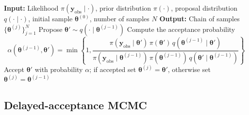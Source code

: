 \documentclass{elsarticle}
\begin{document}
\begin{algorithm}[t]
\caption{Metropolis--Hastings (MH)}
\label{alg:mh}
\begin{algorithmic}[1]
\Statex \textbf{Input:} Likelihood $\pi(\mathbf y_{\mathrm{obs}}\mid \cdot)$, prior distribution $\pi(\cdot)$, proposal distribution $q(\cdot\mid\cdot)$, initial sample $\boldsymbol{\theta}^{(0)}$, number of samples $N$
\Statex \textbf{Output:} Chain of samples $\{\boldsymbol{\theta}^{(j)}\}_{j=1}^N$
    \State Propose $\boldsymbol{\theta}' \sim q(\cdot\mid \boldsymbol{\theta}^{(j-1)})$
    \State Compute the acceptance probability
    \begin{equation*}
        \alpha\!\left(\boldsymbol{\theta}^{(j-1)},\boldsymbol{\theta}'\right)
        =
        \min\left\{
        1,
        \frac{
        \pi(\mathbf y_{\mathrm{obs}}\mid \boldsymbol{\theta}')\,
        \pi(\boldsymbol{\theta}')\,
        q(\boldsymbol{\theta}^{(j-1)}\mid \boldsymbol{\theta}')
        }{
        \pi(\mathbf y_{\mathrm{obs}}\mid \boldsymbol{\theta}^{(j-1)})\,
        \pi(\boldsymbol{\theta}^{(j-1)})\,
        q(\boldsymbol{\theta}'\mid \boldsymbol{\theta}^{(j-1)})
        }
        \right\}
    \end{equation*}
    \State Accept $\boldsymbol{\theta}'$ with probability $\alpha$; if accepted set $\boldsymbol{\theta}^{(j)}=\boldsymbol{\theta}'$, otherwise set $\boldsymbol{\theta}^{(j)}=\boldsymbol{\theta}^{(j-1)}$
\EndFor
\end{algorithmic}
\end{algorithm}

\subsection{Delayed-acceptance MCMC}
\label{sec:da-background}
\end{document}

